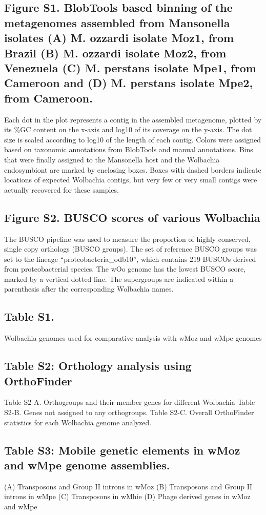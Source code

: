 \documentclass[10pt, a4paper, twocolumn]{article} %
\begin{document}
\subsection{Figure S1. BlobTools based binning of the metagenomes assembled from Mansonella isolates (A) M. ozzardi isolate Moz1, from Brazil (B) M. ozzardi isolate Moz2, from Venezuela (C) M. perstans isolate Mpe1, from Cameroon and (D) M. perstans isolate Mpe2, from Cameroon.} 
Each dot in the plot represents a contig in the assembled metagenome, plotted by its \%GC content on the x-axis and log10 of its coverage on the y-axis. The dot size is scaled according to log10 of the length of each contig. Colors were assigned based on taxonomic annotations from BlobTools and manual annotations. Bins that were finally assigned to the Mansonella host and the Wolbachia endosymbiont are marked by enclosing boxes. Boxes with dashed borders indicate locations of expected Wolbachia contigs, but very few or very small contigs were actually recovered for these samples.

\subsection{Figure S2. BUSCO scores of various Wolbachia}
The BUSCO pipeline was used to measure the proportion of highly conserved, single copy orthologs (BUSCO groups). The set of reference BUSCO groups was set to the lineage “proteobacteria\_odb10”, which contains 219 BUSCOs derived from proteobacterial species. The wOo genome has the lowest BUSCO score, marked by a vertical dotted line. The supergroups are indicated within a parenthesis after the corresponding Wolbachia names.

\subsection{Table S1.} Wolbachia genomes used for comparative analysis with wMoz and wMpe genomes 

\subsection{Table S2: Orthology analysis using OrthoFinder} 
Table S2-A. Orthogroups and their member genes for different Wolbachia 
Table S2-B. Genes not assigned to any orthogroups.
Table S2-C. Overall OrthoFinder statistics for each Wolbachia genome analyzed.

\subsection{Table S3: Mobile genetic elements in wMoz and wMpe genome assemblies.} (A) Transposons and Group II introns in wMoz (B) Transposons and Group II introns in wMpe (C) Transposons in wMhie (D) Phage derived genes in wMoz and wMpe
\end{document}
